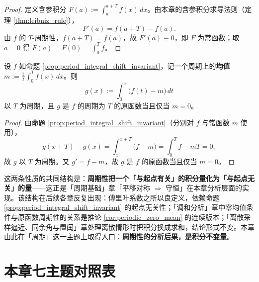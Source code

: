 \begin{proof}
定义含参积分 $F(a):=\int_a^{a+T}f(x)\,dx$。由本章的含参积分求导法则（定理 \ref{thm:leibniz_rule}），
\[
F'(a)=f(a+T)-f(a).
\]
由 $f$ 的 $T$-周期性，$f(a+T)=f(a)$，故 $F'(a)\equiv0$，即 $F$ 为常函数；取 $a=0$ 得 $F(a)=F(0)=\int_0^{T}f$。
\end{proof}

\begin{corollary}[零均值与周期的等价]\label{cor:periodic_zero_mean}
设 $f$ 如命题 \ref{prop:period_integral_shift_invariant}，记一个周期上的\textbf{均值} $m:=\frac1T\int_0^{T}f(x)\,dx$。则
\[
g(x):=\int_0^{x}\bigl(f(t)-m\bigr)\,dt
\]
以 $T$ 为周期，且 $g$ 是 $f$ 的周期为 $T$ 的原函数当且仅当 $m=0$。
\end{corollary}

\begin{proof}
由命题 \ref{prop:period_integral_shift_invariant}（分别对 $f$ 与常函数 $m$ 使用），
\[
g(x+T)-g(x)=\int_x^{x+T}\bigl(f-m\bigr)=\int_0^{T}f-mT=0,
\]
故 $g$ 以 $T$ 为周期。又 $g'=f-m$，故 $g$ 是 $f$ 的原函数当且仅当 $m=0$。
\end{proof}

\begin{remark}[与「周期」主题的接口]\label{rem:ra_period_interface}
这两条性质的共同结构是：\textbf{周期性把一个「与起点有关」的积分量化为「与起点无关」的量}——这正是「周期基础」章「平移对称 $\Rightarrow$ 守恒」在本章分析层面的实现。该结构在后续各章反复出现：傅里叶系数之所以良定义，依赖命题 \ref{prop:period_integral_shift_invariant} 的起点无关性；「调和分析」章中零均值条件与原函数周期性的关系是推论 \ref{cor:periodic_zero_mean} 的连续版本；「离散采样逼近、同余角与置闰」章处理离散情形时把积分换成求和，结论形式不变。本章由此在「周期」这一主题上取得入口：\textbf{周期性的分析后果，是积分不变量}。
\end{remark}


\section*{本章七主题对照表}

